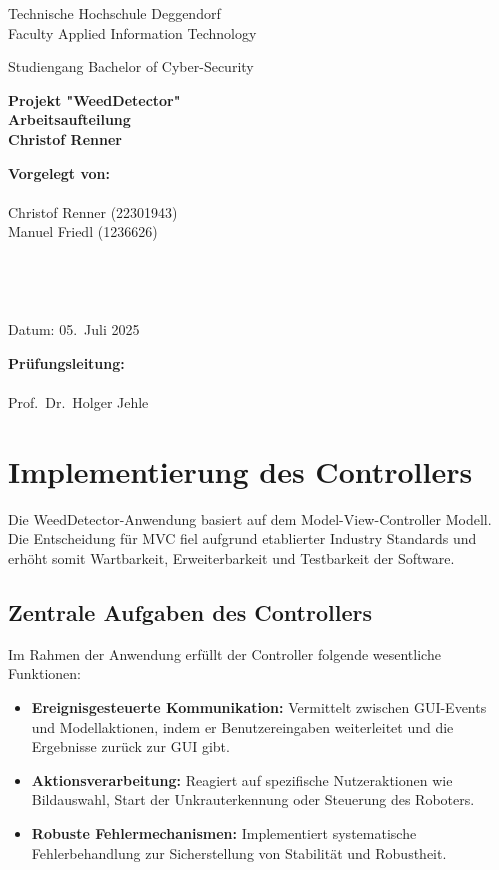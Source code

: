 \documentclass[12pt, a4paper]{scrreprt}
\newcommand{\faculty}{Faculty Applied Information Technology}
\newcommand{\studies}{Bachelor of Cyber-Security}
\newcommand{\thesistitleDE}{Projekt "WeedDetector" \\ Arbeitsaufteilung \\ Christof Renner}
\newcommand{\submissiondate}{05.\ Juli 2025}
\newcommand{\supervisor}{Prof.\ Dr.\ Holger Jehle}
\begin{document}
\begin{titlepage}
  \centering
  {\LARGE Technische Hochschule Deggendorf \\ \faculty \par}
  \vspace{0.3cm}
  {\Large Studiengang \studies \\[1.5cm]}
  {\Huge\bfseries \thesistitleDE\par}
  \vfill
  \begin{minipage}[t]{0.45\textwidth}
    \textbf{Vorgelegt von:}\\
    \\
    Christof Renner (22301943)\\
    Manuel Friedl (1236626)\\
    \\
    \\
    \\
    \\
    Datum: \submissiondate
  \end{minipage}\hfill
  \begin{minipage}[t]{0.45\textwidth}
    \textbf{Prüfungsleitung:}\\
    \\
    \supervisor
  \end{minipage}
\end{titlepage}

\tableofcontents
\newpage

\chapter{Implementierung des Controllers}

Die WeedDetector-Anwendung basiert auf dem Model-View-Controller Modell. Die Entscheidung für MVC fiel aufgrund etablierter Industry Standards und erhöht somit Wartbarkeit, Erweiterbarkeit und Testbarkeit der Software.

\section{Zentrale Aufgaben des Controllers}

Im Rahmen der Anwendung erfüllt der Controller folgende wesentliche Funktionen:

\begin{itemize}
    \item \textbf{Ereignisgesteuerte Kommunikation:} Vermittelt zwischen GUI-Events und Modellaktionen, indem er Benutzereingaben weiterleitet und die Ergebnisse zurück zur GUI gibt.
    \item \textbf{Aktionsverarbeitung:} Reagiert auf spezifische Nutzeraktionen wie Bildauswahl, Start der Unkrauterkennung oder Steuerung des Roboters.
    \item \textbf{Robuste Fehlermechanismen:} Implementiert systematische Fehlerbehandlung zur Sicherstellung von Stabilität und Robustheit.
\end{itemize}
\end{document}
